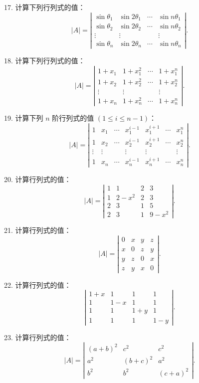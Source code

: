 \documentclass[UTF8, 12pt, fontset=fandol, oneside]{ctexart}
\begin{document}
17. 计算下列行列式的值：
\[
|A|=
\left|\begin{array}{cccc}
\sin\theta_1&\sin2\theta_1&\cdots&\sin n\theta_1\\
\sin\theta_2&\sin2\theta_2&\cdots&\sin n\theta_2\\
\vdots&\vdots&&\vdots\\
\sin\theta_n&\sin2\theta_n&\cdots&\sin n\theta_n
\end{array}\right|.
\]

18. 计算下列行列式的值：
\[
|A|=
\left|\begin{array}{cccc}
1+x_1&1+x_1^2&\cdots&1+x_1^n\\
1+x_2&1+x_2^2&\cdots&1+x_2^n\\
\vdots&\vdots&&\vdots\\
1+x_n&1+x_n^2&\cdots&1+x_n^n
\end{array}\right|.
\]

19. 计算下列 $n$ 阶行列式的值 $(1\le i\le n-1)$：
\[
|A|=
\left|\begin{array}{ccccccc}
1&x_1&\cdots&x_1^{i-1}&x_1^{i+1}&\cdots&x_1^n\\
1&x_2&\cdots&x_2^{i-1}&x_2^{i+1}&\cdots&x_2^n\\
\vdots&\vdots&&\vdots&\vdots&&\vdots\\
1&x_n&\cdots&x_n^{i-1}&x_n^{i+1}&\cdots&x_n^n
\end{array}\right|.
\]

20. 计算行列式的值：
\[
|A|=
\left|\begin{array}{rrrr}
1&1&2&3\\
1&2-x^2&2&3\\
2&3&1&5\\
2&3&1&9-x^2
\end{array}\right|.
\]

21. 计算行列式的值：
\[
|A|=
\left|\begin{array}{rrrr}
0&x&y&z\\
x&0&z&y\\
y&z&0&x\\
z&y&x&0
\end{array}\right|.
\]

22. 计算行列式的值：
\[
\left|\begin{array}{rrrr}
1+x&1&1&1\\
1&1-x&1&1\\
1&1&1+y&1\\
1&1&1&1-y
\end{array}\right|.
\]

23. 计算行列式的值：
\[
|A|=
\left|\begin{array}{ccc}
(a+b)^2&c^2&c^2\\
a^2&(b+c)^2&a^2\\
b^2&b^2&(c+a)^2
\end{array}\right|.
\]
\end{document}
